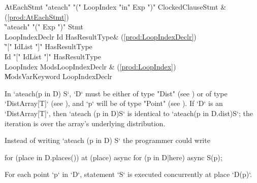\begin{bbgrammar}
          AtEachStmt \: \xcd"ateach" \xcd"(" LoopIndex \xcd"in" Exp \xcd")" ClockedClause\opt Stmt & (\ref{prod:AtEachStmt}) \\
                     \| \xcd"ateach" \xcd"(" Exp \xcd")" Stmt \\
      LoopIndexDeclr \: Id HasResultType\opt & (\ref{prod:LoopIndexDeclr}) \\
                     \| \xcd"[" IdList \xcd"]" HasResultType\opt \\
                     \| Id \xcd"[" IdList \xcd"]" HasResultType\opt \\
           LoopIndex \: Mods\opt LoopIndexDeclr & (\ref{prod:LoopIndex}) \\
                     \| Mods\opt VarKeyword LoopIndexDeclr \\
\end{bbgrammar}
In \xcd`ateach(p in D) S`, \xcd`D` must be either of type \xcd"Dist"
(see ) or of type \xcd`DistArray[T]` (see
), and \xcd`p` will be of type \xcd"Point" (see
). If \xcd`D` is an \xcd`DistArray[T]`, then
\xcd`ateach (p in D)S` is identical to 
\xcd`ateach(p in D.dist)S`; the iteration is over the array's underlying
distribution.   

Instead of writing \xcd`ateach (p in D) S` the programmer could write 

\begin{xten}
for (place in D.places()) at (place) async {
    for (p in D|here) async {
        S(p);
    }
}
\end{xten}
For each point \xcd`p` in \xcd`D`, statement \xcd`S` is executed concurrently 
at place \xcd`D(p)`.

